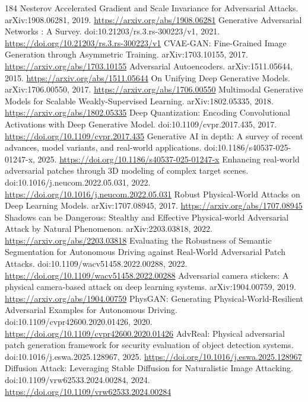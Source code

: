\documentclass[11pt]{article}
\begin{document}
\begin{thebibliography}{184}
 Nesterov Accelerated Gradient and Scale Invariance for Adversarial Attacks. arXiv:1908.06281, 2019. \url{https://arxiv.org/abs/1908.06281}
 Generative Adversarial Networks : A Survey. doi:10.21203/rs.3.rs-300223/v1, 2021. \url{https://doi.org/10.21203/rs.3.rs-300223/v1}
 CVAE-GAN: Fine-Grained Image Generation through Asymmetric Training. arXiv:1703.10155, 2017. \url{https://arxiv.org/abs/1703.10155}
 Adversarial Autoencoders. arXiv:1511.05644, 2015. \url{https://arxiv.org/abs/1511.05644}
 On Unifying Deep Generative Models. arXiv:1706.00550, 2017. \url{https://arxiv.org/abs/1706.00550}
 Multimodal Generative Models for Scalable Weakly-Supervised Learning. arXiv:1802.05335, 2018. \url{https://arxiv.org/abs/1802.05335}
 Deep Quantization: Encoding Convolutional Activations with Deep Generative Model. doi:10.1109/cvpr.2017.435, 2017. \url{https://doi.org/10.1109/cvpr.2017.435}
 Generative AI in depth: A survey of recent advances, model variants, and real-world applications. doi:10.1186/s40537-025-01247-x, 2025. \url{https://doi.org/10.1186/s40537-025-01247-x}
 Enhancing real-world adversarial patches through 3D modeling of complex target scenes. doi:10.1016/j.neucom.2022.05.031, 2022. \url{https://doi.org/10.1016/j.neucom.2022.05.031}
 Robust Physical-World Attacks on Deep Learning Models. arXiv:1707.08945, 2017. \url{https://arxiv.org/abs/1707.08945}
 Shadows can be Dangerous: Stealthy and Effective Physical-world Adversarial Attack by Natural Phenomenon. arXiv:2203.03818, 2022. \url{https://arxiv.org/abs/2203.03818}
 Evaluating the Robustness of Semantic Segmentation for Autonomous Driving against Real-World Adversarial Patch Attacks. doi:10.1109/wacv51458.2022.00288, 2022. \url{https://doi.org/10.1109/wacv51458.2022.00288}
 Adversarial camera stickers: A physical camera-based attack on deep learning systems. arXiv:1904.00759, 2019. \url{https://arxiv.org/abs/1904.00759}
 PhysGAN: Generating Physical-World-Resilient Adversarial Examples for Autonomous Driving. doi:10.1109/cvpr42600.2020.01426, 2020. \url{https://doi.org/10.1109/cvpr42600.2020.01426}
 AdvReal: Physical adversarial patch generation framework for security evaluation of object detection systems. doi:10.1016/j.eswa.2025.128967, 2025. \url{https://doi.org/10.1016/j.eswa.2025.128967}
 Diffusion Attack: Leveraging Stable Diffusion for Naturalistic Image Attacking. doi:10.1109/vrw62533.2024.00284, 2024. \url{https://doi.org/10.1109/vrw62533.2024.00284}

\end{thebibliography}
\end{document}
